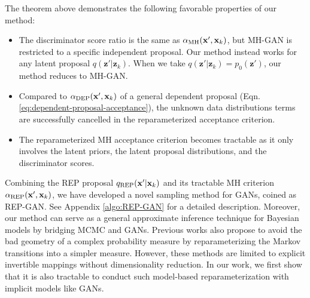\documentclass{article} %
\newcommand{\bx}{\mathbf{x}}
\newcommand{\bz}{\mathbf{z}}
\newcommand{\cX}{\mathcal{X}}
\newcommand{\<}{\left\langle}
\renewcommand{\>}{\right\rangle}
\begin{document}
The theorem above demonstrates the following favorable properties of our method:
\begin{itemize}
\item The discriminator score ratio is the same as $\alpha_{\rm MH}(\bx',\bx_k)$, but MH-GAN is restricted to a specific independent proposal. Our method instead works for any latent proposal $q(\bz'|\bz_k)$. When we take $q(\bz'|\bz_k)=p_0(\bz')$, our method reduces to MH-GAN. 
\item Compared to $\alpha_{\rm DEP}(\bx',\bx_k)$ of a general dependent proposal (Eqn. \eqref{eq:dependent-proposal-acceptance}), the unknown data distributions terms are successfully cancelled in the reparameterized acceptance criterion.
\item The reparameterized MH acceptance criterion becomes tractable as it only involves the latent priors, the latent proposal distributions, and the discriminator scores.
\end{itemize}

Combining the REP proposal $q_{\rm REP}(\bx'|\bx_k)$ and its tractable MH criterion $\alpha_{\rm REP}(\bx',\bx_k)$, we have developed a novel sampling method for GANs, coined as REP-GAN. See Appendix \ref{algo:REP-GAN} for a detailed description.
Moreover, our method can serve as a general approximate inference technique for Bayesian models by bridging MCMC and GANs. Previous works \citep{marzouk2016introduction,titsias2017learning,hoffman2019neutra} also propose to avoid the bad geometry of a complex probability measure by reparameterizing the Markov transitions into a simpler measure. However, these methods are limited to explicit invertible mappings without dimensionality reduction.
In our work, we first show that it is also tractable to conduct such model-based reparameterization with implicit models like GANs. 



\end{document}
